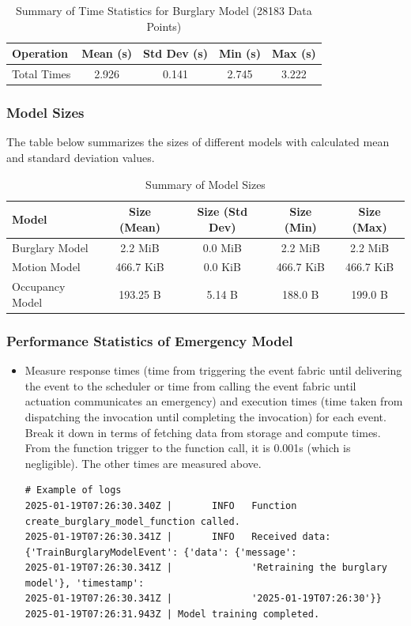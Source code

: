 \documentclass[A4,10pt]{article}
\begin{document}
\begin{table}[H]
\centering
\begin{tabular}{@{}lcccc@{}}
\toprule
\textbf{Operation} & \textbf{Mean (s)} & \textbf{Std Dev (s)} & \textbf{Min (s)} & \textbf{Max (s)} \\
\midrule
Total Times         & 2.926 & 0.141 & 2.745 & 3.222 \\
\bottomrule
\end{tabular}
\caption{Summary of Time Statistics for Burglary Model (28183 Data Points)}
\label{tab:burglary_model_stats_28183}
\end{table}

\subsubsection{Model Sizes}

The table below summarizes the sizes of different models with calculated mean and standard deviation values.

\begin{table}[h!]
\centering
\begin{tabular}{@{}lcccc@{}}
\toprule
\textbf{Model} & \textbf{Size (Mean)} & \textbf{Size (Std Dev)} & \textbf{Size (Min)} & \textbf{Size (Max)} \\
\midrule
Burglary Model      & 2.2 MiB  & 0.0 MiB  & 2.2 MiB  & 2.2 MiB  \\
Motion Model        & 466.7 KiB & 0.0 KiB & 466.7 KiB & 466.7 KiB \\
Occupancy Model     & 193.25 B & 5.14 B & 188.0 B & 199.0 B \\
\midrule
\bottomrule
\end{tabular}
\caption{Summary of Model Sizes}
\label{tab:model_sizes}
\end{table}

\subsubsection{Performance Statistics of Emergency Model}

\begin{itemize}
    \item Measure response times (time from triggering the event fabric until delivering the event to the scheduler or time from calling the event fabric until actuation communicates an emergency) and execution times (time taken from dispatching the invocation until completing the invocation) for each event. Break it down in terms of fetching data from storage and compute times. From the function trigger to the function call, it is 0.001s (which is negligible). The other times are measured above.
\begin{verbatim}
# Example of logs
2025-01-19T07:26:30.340Z |       INFO   Function create_burglary_model_function called.
2025-01-19T07:26:30.341Z |       INFO   Received data: {'TrainBurglaryModelEvent': {'data': {'message': 
2025-01-19T07:26:30.341Z |              'Retraining the burglary model'}, 'timestamp': 
2025-01-19T07:26:30.341Z |              '2025-01-19T07:26:30'}}
2025-01-19T07:26:31.943Z | Model training completed.
\end{verbatim}
\end{itemize}
\end{document}
